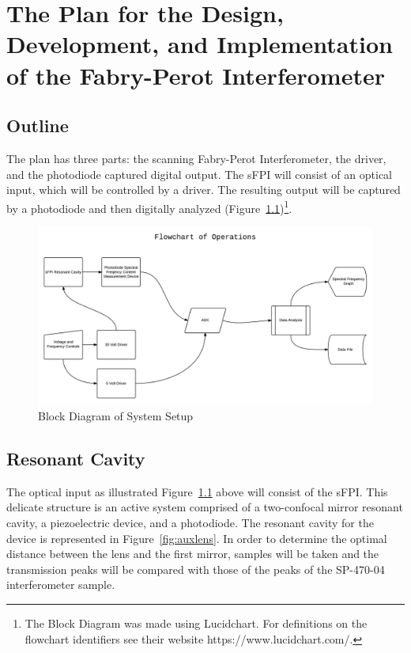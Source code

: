 \documentclass[12pt]{report}
\begin{document}
\chapter[Proposed Plan]{The Plan for the Design, Development, and Implementation of the Fabry-Perot Interferometer}

\section{Outline}
The plan has three parts: the scanning Fabry-Perot Interferometer, the driver, and the photodiode captured digital output. The sFPI will consist of an optical input, which will be controlled by a driver. The resulting output will be captured by a photodiode and then digitally analyzed (Figure~\ref{fig:block_diagram})\footnote{The Block Diagram was made using Lucidchart. For definitions on the flowchart identifiers see their website https://www.lucidchart.com/.}.
\begin{figure}[h!]
	\centering
	\includegraphics[width=6in]{block_diagram.png}
	\caption[Block Diagram]{Block Diagram of System Setup}
	\label{fig:block_diagram}
\end{figure}


\section{Resonant Cavity}
The optical input as illustrated Figure~\ref{fig:block_diagram} above will consist of the sFPI. This delicate structure is an active system comprised of a two-confocal mirror resonant cavity, a piezoelectric device, and a photodiode.  The resonant cavity for the device is represented in Figure~\ref{fig:auxlens}. In order to determine the optimal distance between the lens and the first mirror, samples will be taken and the transmission peaks will be compared with those of the peaks of the SP-470-04 interferometer sample.
\end{document}
